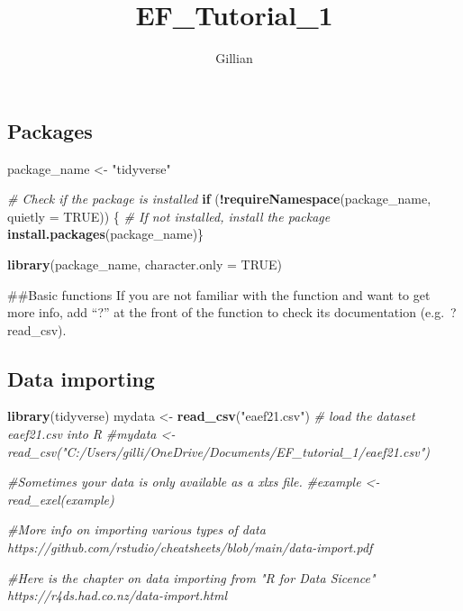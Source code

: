 \documentclass[
]{article}
\title{EF\_Tutorial\_1}
\author{Gillian}
\date{}
\newenvironment{Shaded}{\begin{snugshade}}{\end{snugshade}}
\newcommand{\AttributeTok}[1]{\textcolor[rgb]{0.13,0.29,0.53}{#1}}
\newcommand{\CommentTok}[1]{\textcolor[rgb]{0.56,0.35,0.01}{\textit{#1}}}
\newcommand{\ConstantTok}[1]{\textcolor[rgb]{0.56,0.35,0.01}{#1}}
\newcommand{\ControlFlowTok}[1]{\textcolor[rgb]{0.13,0.29,0.53}{\textbf{#1}}}
\newcommand{\FunctionTok}[1]{\textcolor[rgb]{0.13,0.29,0.53}{\textbf{#1}}}
\newcommand{\NormalTok}[1]{#1}
\newcommand{\OtherTok}[1]{\textcolor[rgb]{0.56,0.35,0.01}{#1}}
\newcommand{\SpecialCharTok}[1]{\textcolor[rgb]{0.81,0.36,0.00}{\textbf{#1}}}
\newcommand{\StringTok}[1]{\textcolor[rgb]{0.31,0.60,0.02}{#1}}
\begin{document}
\maketitle

\hypertarget{packages}{%
\subsection{Packages}\label{packages}}

\begin{Shaded}
\begin{Highlighting}[]
\NormalTok{package\_name }\OtherTok{\textless{}{-}} \StringTok{"tidyverse"}

\CommentTok{\# Check if the package is installed}
\ControlFlowTok{if}\NormalTok{ (}\SpecialCharTok{!}\FunctionTok{requireNamespace}\NormalTok{(package\_name, }\AttributeTok{quietly =} \ConstantTok{TRUE}\NormalTok{)) \{}
  \CommentTok{\# If not installed, install the package}
  \FunctionTok{install.packages}\NormalTok{(package\_name)\}}

\FunctionTok{library}\NormalTok{(package\_name, }\AttributeTok{character.only =} \ConstantTok{TRUE}\NormalTok{)}
\end{Highlighting}
\end{Shaded}

\#\#Basic functions If you are not familiar with the function and want
to get more info, add ``?'' at the front of the function to check its
documentation (e.g.~?read\_csv).

\hypertarget{data-importing}{%
\subsection{Data importing}\label{data-importing}}

\begin{Shaded}
\begin{Highlighting}[]
\FunctionTok{library}\NormalTok{(tidyverse)}
\NormalTok{mydata }\OtherTok{\textless{}{-}} \FunctionTok{read\_csv}\NormalTok{(}\StringTok{"eaef21.csv"}\NormalTok{) }\CommentTok{\# load the dataset eaef21.csv into R }
\CommentTok{\#mydata \textless{}{-} read\_csv("C:/Users/gilli/OneDrive/Documents/EF\_tutorial\_1/eaef21.csv")}

\CommentTok{\#Sometimes your data is only available as a xlxs file.}
\CommentTok{\#example \textless{}{-}read\_exel(example)}

\CommentTok{\#More info on importing various types of data https://github.com/rstudio/cheatsheets/blob/main/data{-}import.pdf}

\CommentTok{\#Here is the chapter on data importing from "R for Data Sicence" https://r4ds.had.co.nz/data{-}import.html}
\end{Highlighting}
\end{Shaded}
\end{document}
